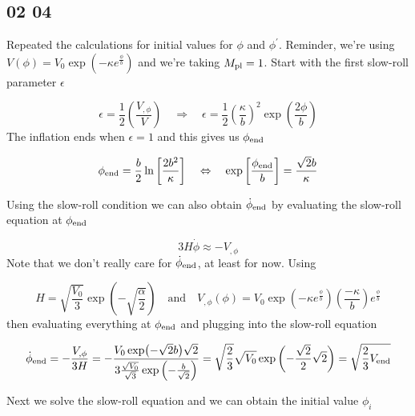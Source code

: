 \subsection*{02 04}
Repeated the calculations for initial values for $\phi$ and $\phi^{\prime}$. Reminder, we're using $V(\phi) = V_0 \exp \left( - \kappa e^{\frac{\phi}{b}} \right)$ and we're taking $M_{\rm pl}=1$. Start with the first slow-roll parameter $\epsilon$

\begin{equation*}
    \epsilon = \frac{1}{2} \left( \frac{V_{, \phi}}{V} \right) \quad \Rightarrow \quad \epsilon = \frac{1}{2} \left( \frac{\kappa}{b} \right)^2 \exp \left( \frac{2 \phi}{b} \right)
\end{equation*}
The inflation ends when $\epsilon = 1$ and this gives us $\phi_{\rm end}$

\begin{equation*}
    \phi_{\rm end} = \frac{b}{2} \ln \left[ \frac{2b^2}{\kappa} \right] \quad \Leftrightarrow \quad \exp \left[ \frac{\phi_{\rm end}}{b} \right] = \frac{\sqrt{2}b}{\kappa}
\end{equation*}

Using the slow-roll condition we can also obtain $\dot{\phi}_{\rm end}$ by evaluating the slow-roll equation at $\phi_{\rm end}$

\begin{equation*}
    3 H \dot{\phi} \approx - V_{, \phi} 
\end{equation*}
Note that we don't really care for $\dot{\phi}_{\rm end}$, at least for now. Using

\begin{equation*}
    H = \sqrt{\frac{V_0}{3}} \exp \left( -\sqrt{\frac{\alpha}{2}} \right) \quad \text{and} \quad V_{, \phi}(\phi) = V_0  \exp \left( - \kappa e^{\frac{\phi}{b}} \right) \left( \frac{-\kappa}{b} \right) e^{\frac{\phi}{b}}
\end{equation*}
then evaluating everything at $\phi_{\rm end}$ and plugging into the slow-roll equation

\begin{equation*}
    \dot{\phi}_{\rm end} = -\frac{V_{, \phi}}{3 H} = - \frac{V_0 \exp(-\sqrt{2}b)\sqrt{2}}{3\frac{\sqrt{V_0}}{\sqrt{3}} \exp \left( -\frac{b}{\sqrt{2}} \right)} = \sqrt{\frac{2}{3}} \sqrt{V_0} \exp \left( - \frac{\sqrt{2}}{2} \sqrt{2} \right) = \sqrt{\frac{2}{3} V_{\rm end}}
\end{equation*}

Next we solve the slow-roll equation and we can obtain the initial value $\phi_{i}$

